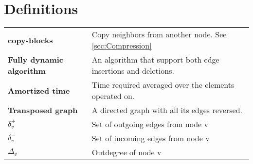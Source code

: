 \chapter*{Definitions}


\begin{tabular}{>{\bfseries}l l }
    copy-blocks & Copy neighbors from another node. See \ref{sec:Compression} \\
    Fully dynamic algorithm & An algorithm that support both edge insertions and deletions.  \\
    Amortized time & Time required averaged over the elements operated on. \\
    Transposed graph & A directed graph with all its edges reversed. \\
    $\delta^+_v$ & Set of outgoing edges from node v \\
    $\delta^-_v$ & Set of incoming edges from node v \\
    $\Delta_v$   & Outdegree of node v
\end{tabular}

